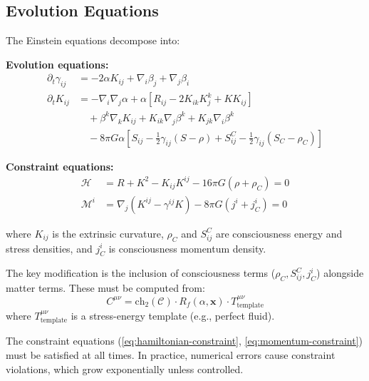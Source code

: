 \subsection{Evolution Equations}

\begin{theorem}\label{thm:adm-consciousness}
The Einstein equations decompose into:

\textbf{Evolution equations:}
\begin{align}
\partial_t \gamma_{ij} &= -2\alpha K_{ij} + \nabla_i \beta_j + \nabla_j \beta_i \label{eq:adm-gamma}\\
\partial_t K_{ij} &= -\nabla_i \nabla_j \alpha + \alpha \left[ R_{ij} - 2K_{ik}K^k_j + K K_{ij} \right] \nonumber\\
&\quad + \beta^k \nabla_k K_{ij} + K_{ik}\nabla_j \beta^k + K_{jk}\nabla_i \beta^k \nonumber\\
&\quad - 8\pi G \alpha \left[ S_{ij} - \frac{1}{2}\gamma_{ij}(S-\rho) + S^C_{ij} - \frac{1}{2}\gamma_{ij}(S_C - \rho_C) \right] \label{eq:adm-K}
\end{align}

\textbf{Constraint equations:}
\begin{align}
\mathcal{H} &= R + K^2 - K_{ij}K^{ij} - 16\pi G (\rho + \rho_C) = 0 \label{eq:hamiltonian-constraint}\\
\mathcal{M}^i &= \nabla_j (K^{ij} - \gamma^{ij} K) - 8\pi G (j^i + j^i_C) = 0 \label{eq:momentum-constraint}
\end{align}

where $K_{ij}$ is the extrinsic curvature, $\rho_C$ and $S^C_{ij}$ are consciousness energy and stress densities, and $j^i_C$ is consciousness momentum density.
\end{theorem}

\begin{level2}
The key modification is the inclusion of consciousness terms ($\rho_C, S^C_{ij}, j^i_C$) alongside matter terms. These must be computed from:
\begin{equation}
C^{\mu\nu} = \text{ch}_2(\mathcal{C}) \cdot R_f(\alpha, \mathbf{x}) \cdot T^{\mu\nu}_{\text{template}}
\end{equation}
where $T^{\mu\nu}_{\text{template}}$ is a stress-energy template (e.g., perfect fluid).

The constraint equations (\ref{eq:hamiltonian-constraint}, \ref{eq:momentum-constraint}) must be satisfied at all times. In practice, numerical errors cause constraint violations, which grow exponentially unless controlled.
\end{level2}

